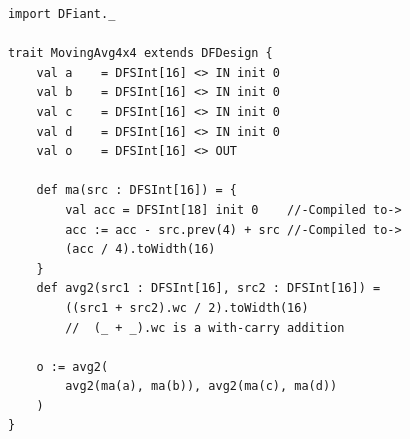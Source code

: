 \begin{table}[t!]
  \centering
  \begin{minipage}[t][12cm][t]{0.50\linewidth}
    \centering
    \captionsetup{justification=centering}    
    \begin{verbatim}
			import DFiant._
			
			trait MovingAvg4x4 extends DFDesign {
				val a    = DFSInt[16] <> IN init 0
				val b    = DFSInt[16] <> IN init 0
				val c    = DFSInt[16] <> IN init 0
				val d    = DFSInt[16] <> IN init 0
				val o    = DFSInt[16] <> OUT
				
				def ma(src : DFSInt[16]) = {     
					val acc = DFSInt[18] init 0    //-Compiled to->
					acc := acc - src.prev(4) + src //-Compiled to->
					(acc / 4).toWidth(16)
				}
				def avg2(src1 : DFSInt[16], src2 : DFSInt[16]) =
					((src1 + src2).wc / 2).toWidth(16)
					//  (_ + _).wc is a with-carry addition
					
				o := avg2(
					avg2(ma(a), ma(b)), avg2(ma(c), ma(d))
				)
			}
			
			
			
			
			

\end{verbatim}
\end{minipage}
\end{table}
